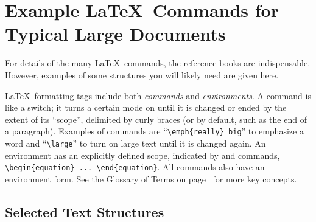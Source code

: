 \chapter{Example \LaTeX\ Commands for Typical Large Documents}
For details of the many \LaTeX\ commands, the reference books are indispensable.
However, examples of some structures you will likely need are given here.

\LaTeX\ formatting tags include both \emph{commands} and \emph{environments}.
A command is like a switch; it turns a certain mode on until it is changed or ended by the extent of its ``scope'', delimited by curly braces (or by default, such as the end of a paragraph).
Examples of commands are ``\verb=\emph{really} big='' to emphasize a word and ``\verb=\large='' to turn on large text until it is changed again.
An environment has an explicitly defined scope, indicated by  and  commands, \eg \verb=\begin{equation} ... \end{equation}=.
All commands also have an environment form.
See the Glossary of Terms on page~\pageref{chap.glossary} for more key concepts. 
\section{Selected Text Structures}

